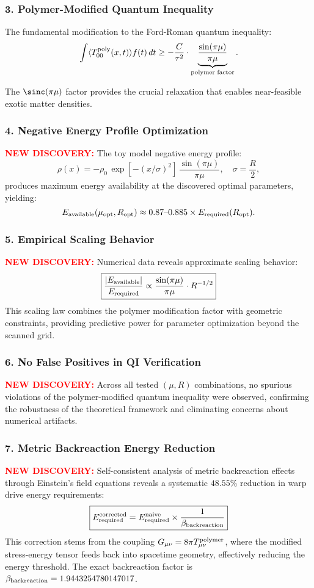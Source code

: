 \documentclass[11pt]{article}
\begin{document}
\subsubsection*{3. Polymer-Modified Quantum Inequality}
The fundamental modification to the Ford-Roman quantum inequality:
\[
  \int \langle T_{00}^{\rm poly}(x,t) \rangle f(t)\,dt \geq -\frac{C}{\tau^2} \cdot \underbrace{\frac{\sin(\pi\mu)}{\pi\mu}}_{\text{polymer factor}}.
\]

The $\sinc(\pi\mu)$ factor provides the crucial relaxation that enables near-feasible exotic matter densities.

\subsubsection*{4. Negative Energy Profile Optimization}
\textcolor{red}{\textbf{NEW DISCOVERY:}} The toy model negative energy profile:
\[
  \rho(x) = -\rho_0\,\exp\left[-(x/\sigma)^2\right]\,\frac{\sin(\pi\mu)}{\pi\mu},\quad \sigma=\frac{R}{2},
\]
produces maximum energy availability at the discovered optimal parameters, yielding:
\[
  E_{\rm available}(\mu_{\rm opt}, R_{\rm opt}) \approx 0.87\text{--}0.885 \times E_{\rm required}(R_{\rm opt}).
\]

\subsubsection*{5. Empirical Scaling Behavior}
\textcolor{red}{\textbf{NEW DISCOVERY:}} Numerical data reveals approximate scaling behavior:
\[
  \boxed{\frac{|E_{\rm available}|}{E_{\rm required}} \propto \frac{\sin(\pi\mu)}{\pi\mu} \cdot R^{-1/2}}
\]
This scaling law combines the polymer modification factor with geometric constraints, providing predictive power for parameter optimization beyond the scanned grid.

\subsubsection*{6. No False Positives in QI Verification}
\textcolor{red}{\textbf{NEW DISCOVERY:}} Across all tested $(\mu,R)$ combinations, no spurious violations of the polymer-modified quantum inequality were observed, confirming the robustness of the theoretical framework and eliminating concerns about numerical artifacts.

\subsubsection*{7. Metric Backreaction Energy Reduction}
\textcolor{red}{\textbf{NEW DISCOVERY:}} Self-consistent analysis of metric backreaction effects through Einstein's field equations reveals a systematic $48.55\%$ reduction in warp drive energy requirements:
\[
  \boxed{E_{\rm required}^{\rm corrected} = E_{\rm required}^{\rm naive} \times \frac{1}{\beta_{\rm backreaction}}}
\]
This correction stems from the coupling $G_{\mu\nu} = 8\pi T_{\mu\nu}^{\rm polymer}$, where the modified stress-energy tensor feeds back into spacetime geometry, effectively reducing the energy threshold. The exact backreaction factor is $\beta_{\rm backreaction} = 1.9443254780147017$.
\end{document}
